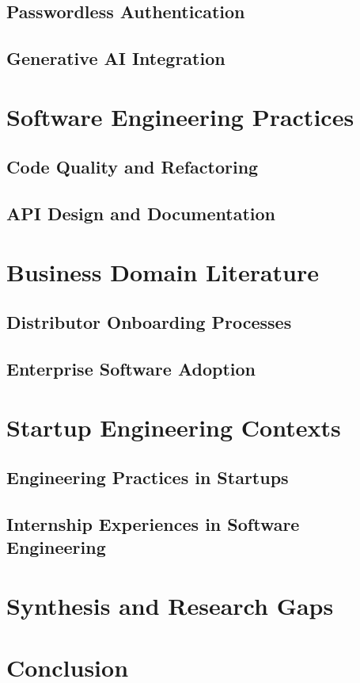 \documentclass[a4paper, 11pt, oneside]{report}
\begin{document}
\subsection{Passwordless Authentication}
\subsection{Generative AI Integration}
\section{Software Engineering Practices}
\subsection{Code Quality and Refactoring}
\subsection{API Design and Documentation}
\section{Business Domain Literature}
\subsection{Distributor Onboarding Processes}
\subsection{Enterprise Software Adoption}
\section{Startup Engineering Contexts}
\subsection{Engineering Practices in Startups}
\subsection{Internship Experiences in Software Engineering}
\section{Synthesis and Research Gaps}
\section{Conclusion}

\end{document}
